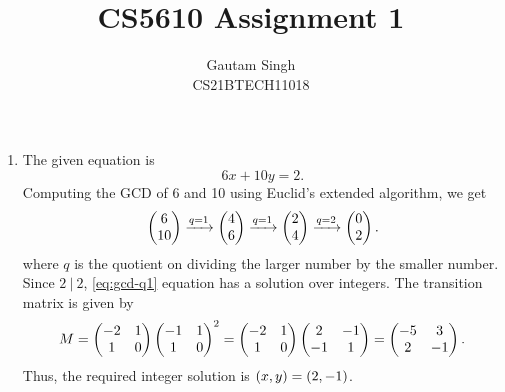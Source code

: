 \documentclass[journal,12pt,onecolumn]{IEEEtran}
\begin{document}
\vspace{3cm}
\title{CS5610 Assignment 1}
\author{Gautam Singh\\CS21BTECH11018}
\maketitle
\bigskip

\begin{enumerate}
    \item The given equation is
    \begin{equation}
        6x + 10y = 2.
        \label{eq:gcd-q1}
    \end{equation}
    Computing the GCD of 6 and 10 using Euclid's extended algorithm, we
    get
    \begin{equation}
        \begin{pmatrix}6\\10\end{pmatrix} \xrightarrow{q=1} \begin{pmatrix}4\\6\end{pmatrix} \xrightarrow{q=1} \begin{pmatrix}2\\4\end{pmatrix} \xrightarrow{q=2} \begin{pmatrix}0\\2\end{pmatrix}.
        \label{eq:euclid-q1}
    \end{equation}
    where \(q\) is the quotient on dividing the larger number by the smaller
    number. Since \(2\ |\ 2\), \eqref{eq:gcd-q1} equation has a solution over
    integers. The transition matrix is given by 
    \begin{equation}
        M = \begin{pmatrix}-2 & 1 \\ 1 & 0\end{pmatrix}\begin{pmatrix}-1 & 1 \\ 1 & 0\end{pmatrix}^2 
        = \begin{pmatrix}-2 & 1 \\ 1 & 0\end{pmatrix}\begin{pmatrix}2 & -1 \\ -1 & 1\end{pmatrix} 
        = \begin{pmatrix}-5 & 3 \\ 2 & -1\end{pmatrix}.
        \label{eq:mtx-q1}
    \end{equation}
    Thus, the required integer solution is \(\left(x, y\right) = \left(2, -1\right)\).


\end{enumerate}
\end{document}
